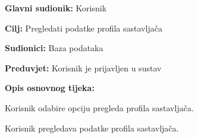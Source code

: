 				\noindent {}
				\begin{packed_item}
					
					\item \textbf{Glavni sudionik: }Korisnik
					\item  \textbf{Cilj:} Pregledati podatke profila sastavljača
					\item  \textbf{Sudionici:} Baza podataka
					\item  \textbf{Preduvjet:} Korisnik je prijavljen u sustav
					\item  \textbf{Opis osnovnog tijeka:}
					
					\item[] \begin{packed_enum}
						
						\item Korisnik odabire opciju pregleda profila sastavljača.
						\item Korisnik pregledava podatke profila sastavljača.
					\end{packed_enum}
					
				\end{packed_item}
			
